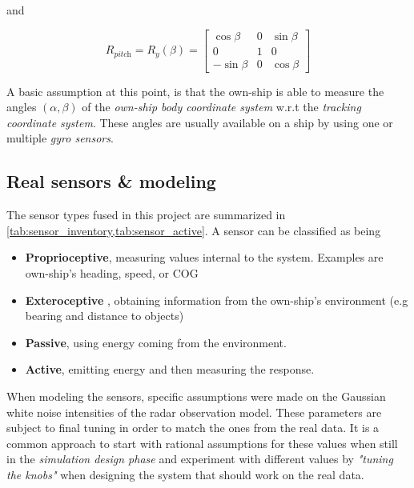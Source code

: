 and


\begin{equation}
R_{\textit{pitch}}= R_y(\beta) =
\begin{bmatrix}
\cos\beta &0 &\sin \beta\\
0 &1 &0\\
-\sin \beta &0 &\cos\beta
\end{bmatrix}
\end{equation}

A basic assumption at this point, is that the own-ship is able to measure the angles $(\alpha,\beta)$ of the \emph{own-ship body coordinate system} w.r.t the \emph{tracking coordinate system}. These angles are usually available on a ship by using one or multiple \emph{gyro sensors}.

\subsection{Real sensors \& modeling}

The sensor types fused in this project are summarized in \cref{tab:sensor_inventory,tab:sensor_active}. A sensor can be classified as being

\begin{itemize}
\item\textbf{Proprioceptive}, measuring values internal to
	the system. Examples are own-ship's heading, speed, or COG
	\item\textbf{Exteroceptive} , obtaining information from the own-ship's environment (e.g bearing and distance to objects)
	\item\textbf{Passive}, using energy coming from the
	environment. 
	\item\textbf{Active}, emitting energy and then measuring the response.
\end{itemize}
 

When modeling the sensors, specific assumptions were made on the Gaussian white noise intensities of the radar observation model. These parameters are subject to final tuning in order to match the ones from the real data. It is a common approach to start with rational assumptions for these values when still in the \emph{simulation design phase} and  experiment with different values by \emph{"tuning the knobs"} when designing the system that should work on the real data. 

